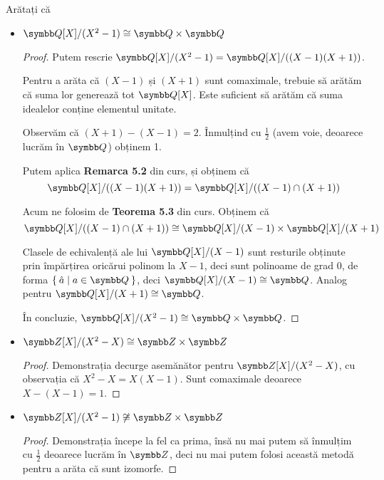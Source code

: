 \begin{exercise}[5.4]
Arătați că
\begin{itemize}
    \item \(\rationals[X] / (X^2 - 1) \cong \rationals \times \rationals\)
    \begin{proof}
    Putem rescrie \(\rationals[X] / (X^2 - 1) = \rationals[X] / ((X - 1)(X + 1))\).
    
    Pentru a arăta că \((X - 1)\) și \((X + 1)\) sunt comaximale, trebuie să arătăm că suma lor generează tot \(\rationals[X]\). Este suficient să arătăm că suma idealelor conține elementul unitate.
    
    Observăm că \((X + 1) - (X - 1) = 2\). Înmulțind cu \(\frac{1}{2}\) (avem voie, deoarece lucrăm în \(\rationals\)) obținem 1.
    
    Putem aplica \textbf{Remarca 5.2} din curs, și obținem că
    \[\rationals[X] / ((X - 1)(X + 1)) = \rationals[X] / ((X - 1) \cap (X + 1))\]
    
    Acum ne folosim de \textbf{Teorema 5.3} din curs. Obținem că
    \[\rationals[X] / ((X - 1) \cap (X + 1)) \cong \rationals[X]/(X - 1) \times \rationals[X]/(X + 1) \]
    
    Clasele de echivalență ale lui \(\rationals[X]/(X - 1)\) sunt resturile obținute prin împărțirea oricărui polinom la \(X - 1\), deci sunt polinoame de grad 0, de forma \(\Set{ \hat{a} | a \in \rationals}\), deci \(\rationals[X]/(X - 1) \cong \rationals\). Analog pentru \(\rationals[X]/(X + 1) \cong \rationals\).
    
    În concluzie, \(\rationals[X] / (X^2 - 1) \cong \rationals \times \rationals\).
    \end{proof}
    
    \item \(\integers[X]/(X^2 - X) \cong \integers \times \integers\)
    \begin{proof}
    Demonstrația decurge asemănător pentru \(\integers[X] / (X^2 - X)\), cu observația că \(X^2 - X = X(X - 1)\). Sunt comaximale deoarece \(X - (X - 1) = 1\).
    \end{proof}
    
    \item \(\integers[X] / (X^2 - 1) \not\cong \integers \times \integers\)
    \begin{proof}
    Demonstrația începe la fel ca prima, însă nu mai putem să înmulțim cu \(\frac{1}{2}\) deoarece lucrăm în \(\integers\), deci nu mai putem folosi această metodă pentru a arăta că sunt izomorfe.
    

\end{proof}
\end{itemize}
\end{exercise}
